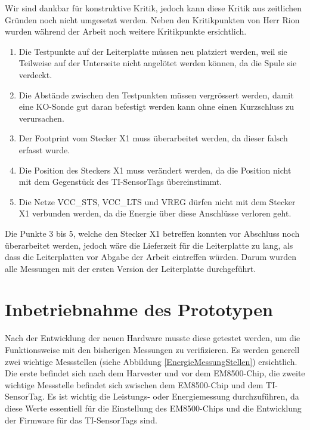 Wir sind dankbar für konstruktive Kritik, jedoch kann diese Kritik aus zeitlichen Gründen noch nicht umgesetzt werden. Neben den Kritikpunkten von Herr Rion wurden während der Arbeit noch weitere Kritikpunkte ersichtlich.

\begin{enumerate}
    \item Die Testpunkte auf der Leiterplatte müssen neu platziert werden, weil sie Teilweise auf der Unterseite nicht angelötet werden können, da die Spule sie verdeckt. 
    \item Die Abstände zwischen den Testpunkten müssen vergrössert werden, damit eine KO-Sonde gut daran befestigt werden kann ohne einen Kurzschluss zu verursachen.
    \item Der Footprint vom Stecker X1 muss überarbeitet werden, da dieser falsch erfasst wurde.
	\item Die Position des Steckers X1 muss verändert werden, da die Position nicht mit dem Gegenstück des TI-SensorTags übereinstimmt.
	\item Die Netze VCC\_STS, VCC\_LTS und VREG dürfen nicht mit dem Stecker X1 verbunden werden, da die Energie über diese Anschlüsse verloren geht.
\end{enumerate}

Die Punkte 3 bis 5, welche den Stecker X1 betreffen konnten vor Abschluss noch überarbeitet werden, jedoch wäre die Lieferzeit für die Leiterplatte zu lang, als dass die Leiterplatten vor Abgabe der Arbeit eintreffen würden. Darum wurden alle Messungen mit der ersten Version der Leiterplatte durchgeführt.


\section{Inbetriebnahme des Prototypen}

Nach der Entwicklung der neuen Hardware musste diese getestet werden, um die Funktionsweise mit den bisherigen Messungen zu verifizieren. Es werden generell zwei wichtige Messstellen (siehe Abbildung \ref{EnergieMessungStellen}) ersichtlich. Die erste befindet sich nach dem Harvester und vor dem EM8500-Chip, die zweite wichtige Messstelle befindet sich zwischen dem EM8500-Chip und dem TI-SensorTag. Es ist wichtig die Leistungs- oder Energiemessung durchzuführen, da diese Werte essentiell für die Einstellung des EM8500-Chips und die Entwicklung der Firmware für das TI-SensorTags sind. 

